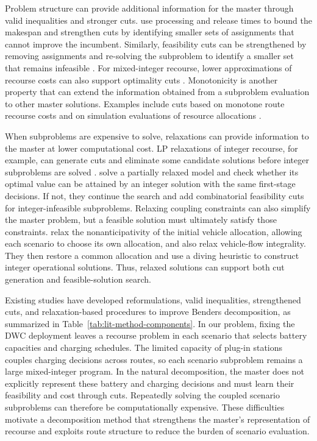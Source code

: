 Problem structure can provide additional information for the master through valid inequalities and stronger cuts.
\citet{li_scheduling_location_2022} use processing and release times to bound the makespan and strengthen cuts by identifying smaller sets of assignments that cannot improve the incumbent.
Similarly, feasibility cuts can be strengthened by removing assignments and re-solving the subproblem to identify a smaller set that remains infeasible \citep{elci_stochastic_2022}.
For mixed-integer recourse, lower approximations of recourse costs can also support optimality cuts \citep{vanderlaan_converging_2024,baals_milk_runs_2026}.
Monotonicity is another property that can extend the information obtained from a subproblem evaluation to other master solutions.
Examples include cuts based on monotone route recourse costs and on simulation evaluations of resource allocations \citep{parada_disaggregated_2024,forbes_simulation_2024}.

When subproblems are expensive to solve, relaxations can provide information to the master at lower computational cost.
LP relaxations of integer recourse, for example, can generate cuts and eliminate some candidate solutions before integer subproblems are solved \citep{angulo_improving_2016,satici_network_2026}.
\citet{calik_stations_2019} solve a partially relaxed model and check whether its optimal value can be attained by an integer solution with the same first-stage decisions.
If not, they continue the search and add combinatorial feasibility cuts for integer-infeasible subproblems.
Relaxing coupling constraints can also simplify the master problem, but a feasible solution must ultimately satisfy those constraints.
\citet{chen_integrated_2023} relax the nonanticipativity of the initial vehicle allocation, allowing each scenario to choose its own allocation, and also relax vehicle-flow integrality.
They then restore a common allocation and use a diving heuristic to construct integer operational solutions.
Thus, relaxed solutions can support both cut generation and feasible-solution search.

Existing studies have developed reformulations, valid inequalities, strengthened cuts, and relaxation-based procedures to improve Benders decomposition, as summarized in Table~\ref{tab:lit-method-components}.
In our problem, fixing the DWC deployment leaves a recourse problem in each scenario that selects battery capacities and charging schedules.
The limited capacity of plug-in stations couples charging decisions across routes, so each scenario subproblem remains a large mixed-integer program.
In the natural decomposition, the master does not explicitly represent these battery and charging decisions and must learn their feasibility and cost through cuts.
Repeatedly solving the coupled scenario subproblems can therefore be computationally expensive.
These difficulties motivate a decomposition method that strengthens the master's representation of recourse and exploits route structure to reduce the burden of scenario evaluation.

